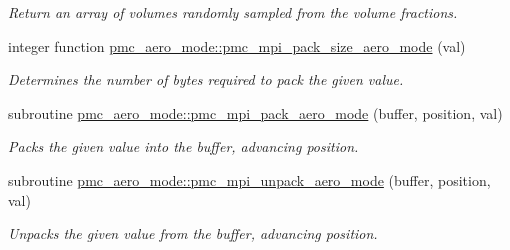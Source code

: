 \begin{DoxyCompactItemize}
\begin{DoxyCompactList}\small\item\em Return an array of volumes randomly sampled from the volume fractions. \end{DoxyCompactList}\item 
integer function \mbox{\hyperlink{namespacepmc__aero__mode_a1e69cce7379ea06939d1181b8486288a}{pmc\+\_\+aero\+\_\+mode\+::pmc\+\_\+mpi\+\_\+pack\+\_\+size\+\_\+aero\+\_\+mode}} (val)
\begin{DoxyCompactList}\small\item\em Determines the number of bytes required to pack the given value. \end{DoxyCompactList}\item 
subroutine \mbox{\hyperlink{namespacepmc__aero__mode_a33ac48c507ea64a72353c01a32dc43c1}{pmc\+\_\+aero\+\_\+mode\+::pmc\+\_\+mpi\+\_\+pack\+\_\+aero\+\_\+mode}} (buffer, position, val)
\begin{DoxyCompactList}\small\item\em Packs the given value into the buffer, advancing position. \end{DoxyCompactList}\item 
subroutine \mbox{\hyperlink{namespacepmc__aero__mode_a2c5e4a5984c400daaa6b5723662122f3}{pmc\+\_\+aero\+\_\+mode\+::pmc\+\_\+mpi\+\_\+unpack\+\_\+aero\+\_\+mode}} (buffer, position, val)
\begin{DoxyCompactList}\small\item\em Unpacks the given value from the buffer, advancing position. \end{DoxyCompactList}\end{DoxyCompactItemize}

